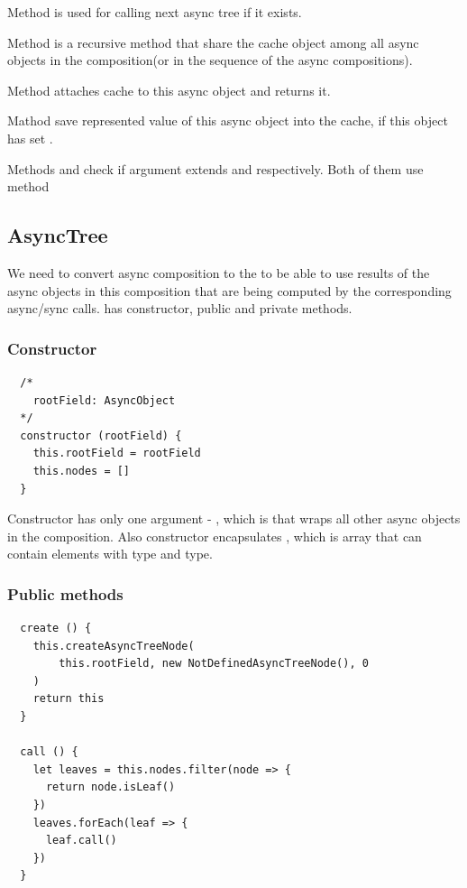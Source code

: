 \documentclass{article}
\begin{document}
Method  is used for calling next async tree if it exists.

Method  is a recursive method that share the cache object among all async objects in the composition(or in the sequence of the async compositions).

Method  attaches cache to this async object and returns it.

Mathod  save represented value of this async object into the cache, if this object has set .

Methods  and  check if argument extends  and  respectively. Both of them use method 

\vspace*{10px}

\subsection{AsyncTree}

We need to convert async composition to the  to be able to use results of the async objects in this composition that are being computed by the corresponding async/sync calls.  has constructor, public and private methods.

\subsubsection{Constructor}

\begin{verbatim}
  /*
    rootField: AsyncObject
  */
  constructor (rootField) {
    this.rootField = rootField
    this.nodes = []
  }
\end{verbatim}

Constructor has only one argument - , which is  that wraps all other async objects in the composition. Also constructor encapsulates , which is array that can contain elements with  type and  type.

\subsubsection{Public methods}

\begin{verbatim}
  create () {
    this.createAsyncTreeNode(
        this.rootField, new NotDefinedAsyncTreeNode(), 0
    )
    return this
  }

  call () {
    let leaves = this.nodes.filter(node => {
      return node.isLeaf()
    })
    leaves.forEach(leaf => {
      leaf.call()
    })
  }
\end{verbatim}
\end{document}
